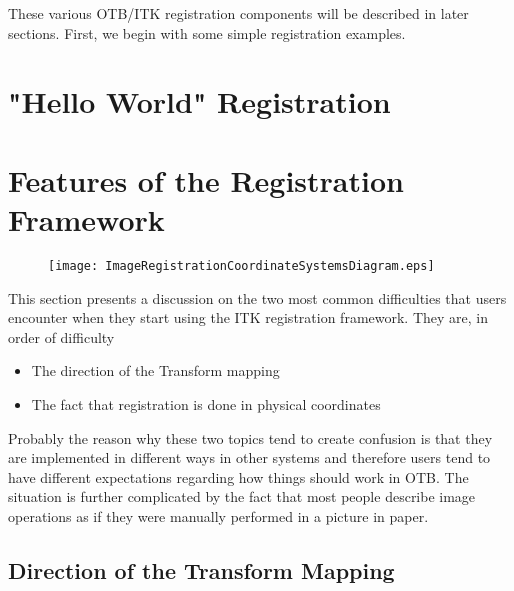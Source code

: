 These various OTB/ITK registration components will be described in later
sections.  First, we begin with some simple registration examples.

\section{"Hello World" Registration}
\label{sec:IntroductionImageRegistration}
\ifitkFullVersion

\fi

\section{Features of the Registration Framework}
\label{sec:FeaturesOfTheRegistrationFramework}

\begin{figure}
\center
\texttt{[image: ImageRegistrationCoordinateSystemsDiagram.eps]}
\label{fig:ImageRegistrationCoordinateSystemsDiagram}
\end{figure}


This section presents a discussion on the two most common difficulties that
users encounter when they start using the ITK registration framework. They are,
in order of difficulty

\begin{itemize}
\item The direction of the Transform mapping
\item The fact that registration is done in physical coordinates
\end{itemize}

Probably the reason why these two topics tend to create confusion is that they
are implemented in different ways in other systems and therefore users tend to
have different expectations regarding how things should work in OTB. The
situation is further complicated by the fact that most people describe image
operations as if they were manually performed in a picture in paper.

\subsection{Direction of the Transform Mapping}
\label{sec:DirectionOfTheTransformMapping}

